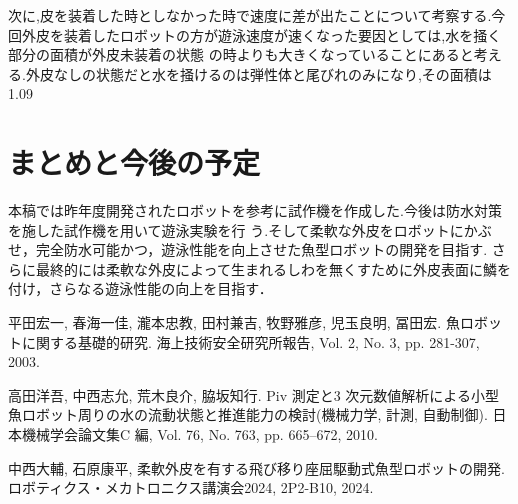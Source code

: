 \documentclass{jarticle}
\begin{document}
次に,皮を装着した時としなかった時で速度に差が出たことについて考察する.今回外皮を装着したロボットの方が遊泳速度が速くなった要因としては,水を掻く部分の面積が外皮未装着の状態
の時よりも大きくなっていることにあると考える.外皮なしの状態だと水を掻けるのは弾性体と尾びれのみになり,その面積は1.09






\section{まとめと今後の予定}

本稿では昨年度開発されたロボットを参考に試作機を作成した.今後は防水対策を施した試作機を用いて遊泳実験を行
う.そして柔軟な外皮をロボットにかぶせ，完全防水可能かつ，遊泳性能を向上させた魚型ロボットの開発を目指す.
さらに最終的には柔軟な外皮によって生まれるしわを無くすために外皮表面に鱗を付け，さらなる遊泳性能の向上を目指す．



% 
% 


\begin{thebibliography}{99}

   平田宏一, 春海一佳, 瀧本忠教, 田村兼吉, 牧野雅彦, 児玉良明, 冨田宏. 魚ロボットに関する基礎的研究. 海上技術安全研究所報告, Vol. 2, No. 3, pp. 281-307, 2003.

   高田洋吾, 中西志允, 荒木良介, 脇坂知行. Piv 測定と3 次元数値解析による小型魚ロボット周りの水の流動状態と推進能力の検討(機械力学, 計測, 自動制御). 日本機械学会論文集C 編, Vol. 76, No. 763, pp. 665–672, 2010.

   中西大輔, 石原康平, 柔軟外皮を有する飛び移り座屈駆動式魚型ロボットの開発. ロボティクス・メカトロニクス講演会2024, 2P2-B10, 2024.

\end{thebibliography}
\end{document}
